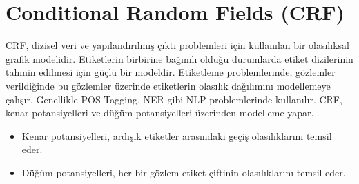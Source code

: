 \section{Conditional Random Fields (CRF)}
CRF, dizisel veri ve yapılandırılmış çıktı problemleri için kullanılan bir olasılıksal grafik modelidir. Etiketlerin birbirine bağımlı olduğu durumlarda etiket dizilerinin tahmin edilmesi için güçlü bir modeldir. Etiketleme problemlerinde, gözlemler verildiğinde bu gözlemler üzerinde etiketlerin olasılık dağılımını modellemeye çalışır. Genellikle POS Tagging, NER gibi NLP problemlerinde kullanılır. CRF, kenar potansiyelleri ve düğüm potansiyelleri üzerinden modelleme yapar.
\begin{itemize}
	\item Kenar potansiyelleri, ardışık etiketler arasındaki geçiş olasılıklarını temsil eder.
	\item Düğüm potansiyelleri, her bir gözlem-etiket çiftinin olasılıklarını temsil eder.
\end{itemize}

\newpage